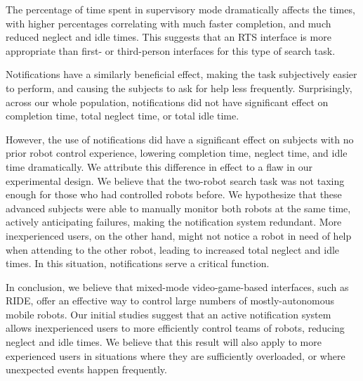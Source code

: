 The percentage of time spent in supervisory mode dramatically affects the times, with higher percentages correlating with much faster completion, and much reduced neglect and idle times. This suggests that an RTS interface is more appropriate than first- or third-person interfaces for this type of search task.

Notifications have a similarly beneficial effect, making the task subjectively easier to perform, and causing the subjects to ask for help less frequently. Surprisingly, across our whole population, notifications did not have significant effect on completion time, total neglect time, or total idle time.

However, the use of notifications did have a significant effect on subjects with no prior robot control experience, lowering completion time, neglect time, and idle time dramatically. We attribute this difference in effect to a flaw in our experimental design. We believe that the two-robot search task was not taxing enough for those who had controlled robots before. We hypothesize that these advanced subjects were able to manually monitor both robots at the same time, actively anticipating failures, making the notification system redundant. More inexperienced users, on the other hand, might not notice a robot in need of help when attending to the other robot, leading to increased total neglect and idle times. In this situation, notifications serve a critical function.

In conclusion, we believe that mixed-mode video-game-based interfaces, such as RIDE, offer an effective way to control large numbers of mostly-autonomous mobile robots. Our initial studies suggest that an active notification system allows inexperienced users to more efficiently control teams of robots, reducing neglect and idle times. We believe that this result will also apply to more experienced users in situations where they are sufficiently overloaded, or where unexpected events happen frequently.

